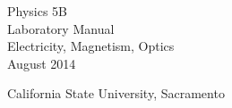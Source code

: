 % 
%

\begin{fullwidth}
\thispagestyle{empty}		%
\vspace*	{2in}
\begin{center}
	\HUGE\textsf{Physics 5B}\\[0.2em]
	\LARGE\textsf{Laboratory Manual}\\[1em]
	\HUGE\textsf{Electricity, Magnetism, Optics}\\[0.2em]
	\Huge\textsf{August 2014}\\
\end{center}
\vfill
\begin{center}
\LARGE\textsf{California State University, Sacramento}\par
\end{center}
 
\vspace*{\fill}

\end{fullwidth}

\clearpage